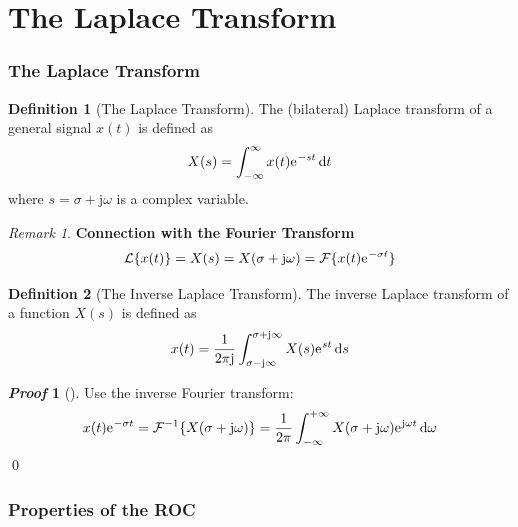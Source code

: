 \documentclass[10pt,UTF8]{article}
\newenvironment{definition box}
{\begin{tcolorbox}[colback=blue!5!white,colframe=blue!75!black,parbox=false,before upper=\par,before lower=\par]}
{\end{tcolorbox}}
\newenvironment{theorem box}
{\begin{tcolorbox}[colback=yellow!5!white,colframe=yellow!75!black,parbox=false,before upper=\par,before lower=\par]}
{\end{tcolorbox}}
\theoremstyle{definition}
\newtheorem{definition inner}{Definition}[section]
\newenvironment{definition}[1][]
{\begin{definition box}\begin{definition inner}[#1]\hfill\par}
{\end{definition inner}\end{definition box}}
\theoremstyle{plain}
\newtheorem{theorem inner}{Theorem}[section]
\theoremstyle{definition}
\newtheorem*{proof inner}{\textit{Proof}}
\renewenvironment{proof}[1][]
{\begin{proof inner}[#1]\hfill\par}
{\qed\end{proof inner}}
\theoremstyle{remark}
\newtheorem*{remark}{\textit{Remark}}
\newcommand{\ju}{\mathrm{j}}  %
\newcommand{\e}{\mathrm{e}{\mkern 1 mu}}
\begin{document}
\part*{The Laplace Transform}

\section{The Laplace Transform}

\begin{definition}[The Laplace Transform]
The (bilateral) Laplace transform of a general signal $x(t)$ is defined as
\begin{equation*}
    X(s) =
    \int_{-\infty}^{\infty}x(t)\e^{-s t}\dd{t}
\end{equation*}
where $s=\sigma + \ju\omega$ is a complex variable.
\end{definition}

\begin{remark}
\textbf{Connection with the Fourier Transform}
\begin{equation*}
    \mathcal{L}\{x(t)\} = X(s) =
    X(\sigma+\ju\omega) = \mathcal{F}\{x(t)\e^{-\sigma t}\}
\end{equation*}
\end{remark}

\begin{definition}[The Inverse Laplace Transform]
The inverse Laplace transform of a function $X(s)$ is defined as
\begin{equation*}
    x(t) = \frac{1}{2\pi\ju}\int_{\sigma-\ju\infty}^{\sigma+\ju\infty}X(s)\e^{st}\dd{s}
\end{equation*}
\end{definition}
\begin{proof}
    Use the inverse Fourier transform:
    \begin{equation*}
        x(t)\e^{-\sigma t} = \mathcal{F}^{-1}\{X(\sigma+\ju\omega)\} =
        \frac{1}{2\pi}\int_{-\infty}^{+\infty}
        X(\sigma+\ju\omega)\e^{\ju\omega t}\dd{\omega}
    \end{equation*}
\end{proof}



\section{Properties of the ROC}
\end{document}
